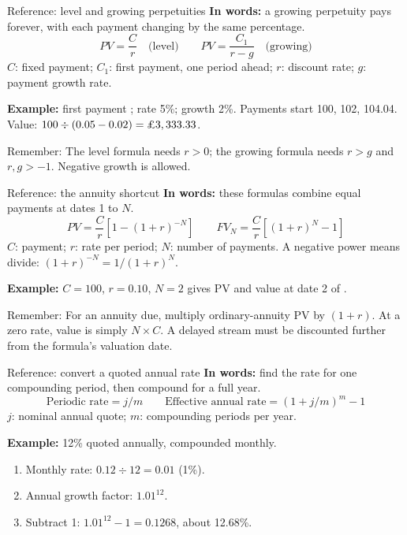 \documentclass[10pt,aspectratio=169]{beamer}
\newcommand{\remember}[1]{\par\smallskip\alert{Remember:} #1}
\renewcommand{\pounds}{\ifmmode\text{\textsterling}\else\textsterling\fi}
\begin{document}
\begin{frame}[label=growing]{Reference: level and growing perpetuities}
\textbf{In words:} a growing perpetuity pays forever, with each payment changing by the same percentage.
\[
PV=\frac{C}{r}\quad\text{(level)}\qquad
PV=\frac{C_1}{r-g}\quad\text{(growing)}
\]
$C$: fixed payment; $C_1$: first payment, one period ahead; $r$: discount rate; $g$: payment growth rate.
\par\smallskip
\textbf{Example:} first payment \pounds100; rate 5\%; growth 2\%.
Payments start 100, 102, 104.04. Value: $100\div(0.05-0.02)=\pounds3,333.33$.
\remember{The level formula needs $r>0$; the growing formula needs $r>g$ and $r,g>-1$. Negative growth is allowed.}
\end{frame}

\begin{frame}[label=annuity]{Reference: the annuity shortcut}
\textbf{In words:} these formulas combine equal payments at dates 1 to $N$.
\[
PV=\frac{C}{r}\left[1-(1+r)^{-N}\right]\qquad
FV_N=\frac{C}{r}\left[(1+r)^N-1\right]
\]
$C$: payment; $r$: rate per period; $N$: number of payments. A negative power means divide: $(1+r)^{-N}=1/(1+r)^N$.
\par\smallskip
\textbf{Example:} $C=100$, $r=0.10$, $N=2$ gives PV \pounds173.55 and value at date 2 of \pounds210.
\remember{For an annuity due, multiply ordinary-annuity PV by $(1+r)$. At a zero rate, value is simply $N\times C$. A delayed stream must be discounted further from the formula's valuation date.}
\end{frame}

\begin{frame}[label=rates]{Reference: convert a quoted annual rate}
\textbf{In words:} find the rate for one compounding period, then compound for a full year.
\[
\text{Periodic rate}=j/m\qquad
\text{Effective annual rate}=(1+j/m)^m-1
\]
$j$: nominal annual quote; $m$: compounding periods per year.
\par\smallskip
\textbf{Example:} 12\% quoted annually, compounded monthly.
\begin{enumerate}
\item Monthly rate: $0.12\div12=0.01$ (1\%).
\item Annual growth factor: $1.01^{12}$.
\item Subtract 1: $1.01^{12}-1=0.1268$, about 12.68\%.
\end{enumerate}
\end{frame}
\end{document}
